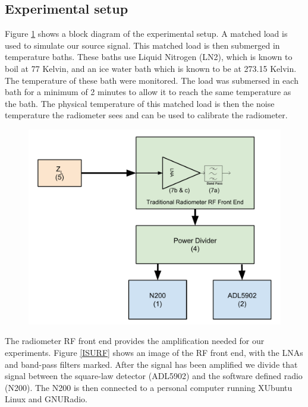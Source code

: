 \subsection{Experimental setup} \label{exp1_setup}

Figure \ref{Exp1_Block} shows a block diagram of the experimental setup.  A matched load is used to simulate our source signal.  This matched load is then submerged in temperature baths.  These baths use Liquid Nitrogen (LN2), which is known to boil at 77 Kelvin, and an ice water bath which is known to be at 273.15 Kelvin.  The temperature of these bath were monitored.  The load was submersed in each bath for a minimum of 2 minutes to allow it to reach the same temperature as the bath.  The physical temperature of this matched load is then the noise temperature the radiometer sees and can be used to calibrate the radiometer.  

{\begin{figure}[h!tb] \centering
\includegraphics[width=\textwidth]{Images/Exp_1_Setup.pdf}
\label{Exp1_Block}
\end{figure}
}

The radiometer RF front end provides the amplification needed for our experiments.  Figure \ref{ISURF} shows an image of the RF front end, with the LNAs and band-pass filters marked.  After the signal has been amplified we divide that signal between the square-law detector (ADL5902) and the software defined radio (N200).  The N200 is then connected to a personal computer running XUbuntu Linux and GNURadio.


